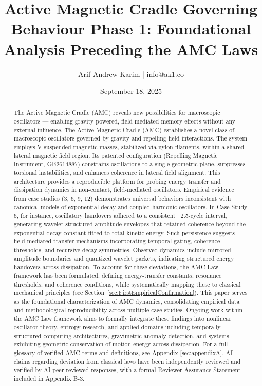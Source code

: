 \documentclass[10pt,aps,pre,onecolumn,superscriptaddress,notitlepage]{revtex4-2}
\begin{document}
\title{\large Active Magnetic Cradle Governing Behaviour  
 \small Phase 1: Foundational Analysis Preceding the AMC Laws}

\author{Arif Andrew Karim | info@ak1.co}

\date{September 18, 2025}
\begin{abstract}
\label{sec:abs}

The Active Magnetic Cradle (AMC) reveals new possibilities for macroscopic oscillators — enabling gravity-powered, field-mediated memory effects without any external influence.
The Active Magnetic Cradle (AMC) establishes a novel class of macroscopic oscillators governed by gravity and repelling-field interactions. The system employs V-suspended magnetic masses, stabilized via nylon filaments, within a shared lateral magnetic field region. Its patented configuration (Repelling Magnetic Instrument, GB2614887) constrains oscillations to a single geometric plane, suppresses torsional instabilities, and enhances coherence in lateral field alignment.
This architecture provides a reproducible platform for probing energy transfer and dissipation dynamics in non-contact, field-mediated oscillators. Empirical evidence from case studies (3, 6, 9, 12) demonstrates universal behaviors inconsistent with canonical models of exponential decay and coupled harmonic oscillators. In Case Study 6, for instance, oscillatory handovers adhered to a consistent ~2.5-cycle interval, generating wavelet-structured amplitude envelopes that retained coherence beyond the exponential decay constant fitted to total kinetic energy.
Such persistence suggests field-mediated transfer mechanisms incorporating temporal gating, coherence thresholds, and recursive decay symmetries. Observed dynamics include mirrored amplitude boundaries and quantized wavelet packets, indicating structured energy handovers across dissipation. To account for these deviations, the AMC Law framework has been formulated, defining energy-transfer constants, resonance thresholds, and coherence conditions, while systematically mapping these to classical mechanical principles (see Section~\ref{sec:FirstEmpiricalConfirmation}).
This paper serves as the foundational characterization of AMC dynamics, consolidating empirical data and methodological reproducibility across multiple case studies. Ongoing work within the AMC Law framework aims to formally integrate these findings into nonlinear oscillator theory, entropy research, and applied domains including temporally structured computing architectures, gravimetric anomaly detection, and systems exhibiting geometric conservation of motion-energy across dissipation. 
For a full glossary of verified AMC terms and definitions, see Appendix \ref{sec:appendixA}. All claims regarding deviation from classical laws have been independently reviewed and verified by AI peer-reviewed responses, with a formal Reviewer Assurance Statement included in Appendix B-3.

\end{abstract}
\end{document}
